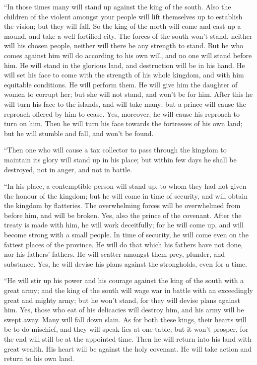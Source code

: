  ``In those times many will stand up against the king of
the south. Also the children of the violent amongst your people will
lift themselves up to establish the vision; but they will fall.
 So the king of the north will come and cast up a mound,
and take a well-fortified city. The forces of the south won't stand,
neither will his chosen people, neither will there be any strength to
stand.  But he who comes against him will do according to
his own will, and no one will stand before him. He will stand in the
glorious land, and destruction will be in his hand.  He
will set his face to come with the strength of his whole kingdom, and
with him equitable conditions. He will perform them. He will give him
the daughter of women to corrupt her; but she will not stand, and won't
be for him.  After this he will turn his face to the
islands, and will take many; but a prince will cause the reproach
offered by him to cease. Yes, moreover, he will cause his reproach to
turn on him.  Then he will turn his face towards the
fortresses of his own land; but he will stumble and fall, and won't be
found.

 ``Then one who will cause a tax collector to pass through
the kingdom to maintain its glory will stand up in his place; but within
few days he shall be destroyed, not in anger, and not in battle.

 ``In his place, a contemptible person will stand up, to
whom they had not given the honour of the kingdom; but he will come in
time of security, and will obtain the kingdom by flatteries.
 The overwhelming forces will be overwhelmed from before
him, and will be broken. Yes, also the prince of the covenant.
 After the treaty is made with him, he will work
deceitfully; for he will come up, and will become strong with a small
people.  In time of security, he will come even on the
fattest places of the province. He will do that which his fathers have
not done, nor his fathers' fathers. He will scatter amongst them prey,
plunder, and substance. Yes, he will devise his plans against the
strongholds, even for a time.

 ``He will stir up his power and his courage against the
king of the south with a great army; and the king of the south will wage
war in battle with an exceedingly great and mighty army; but he won't
stand, for they will devise plans against him.  Yes, those
who eat of his delicacies will destroy him, and his army will be swept
away. Many will fall down slain.  As for both these kings,
their hearts will be to do mischief, and they will speak lies at one
table; but it won't prosper, for the end will still be at the appointed
time.  Then he will return into his land with great wealth.
His heart will be against the holy covenant. He will take action and
return to his own land.

